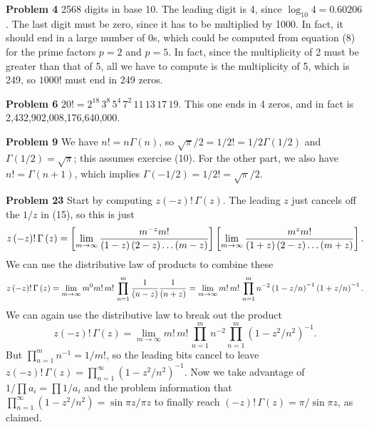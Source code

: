 \noindent
{\bf Problem 4} 2568 digits in base 10.  The leading digit is 4, since $\log_{10} 4 = 0.60206$.
 The last digit must be zero, since it has to be multiplied by 1000.  In fact,
 it should end in a large number of 0s, which could be computed from equation (8)
 for the prime factors $p=2$ and $p=5$.  In fact, since the multiplicity of 2 must be
 greater than that of 5, all we have to compute is the multiplicity of 5, which is 249,
 so $1000!$ must end in 249 zeros.

\vskip 0.1in
\noindent
{\bf Problem 6} $20! = 2^{18}\, 3^8\, 5^4\, 7^2\, 11\, 13\, 17\, 19$.  This one ends in
 4 zeros, and in fact is 2,432,902,008,176,640,000.

\vskip 0.1in
\noindent
{\bf Problem 9} We have $n! = n \Gamma\left(n\right)$, so $\sqrt{\pi}/2 = 1/2! = 1/2 \Gamma\left( 1/2 \right)$
 and $\Gamma\left(1/2\right) = \sqrt{\pi}$; this assumes exercise (10).  For the other part, we also have
 $n! = \Gamma\left(n+1\right)$, which implies $\Gamma\left(-1/2\right) = 1/2! = \sqrt{\pi}/2$.

\vskip 0.1in
\noindent
{\bf Problem 23} Start by computing $z \left(-z\right)! \, \Gamma \left( z \right)$.  The leading $z$ just cancels
 off the $1/z$ in (15), so this is just 
 $$
   z \left(-z\right)! \, \Gamma \left( z \right) =
      \left[ \lim_{m \to \infty} {m^{-z} m! \over \left(1-z\right)\left(2-z\right)
      \ldots\left(m-z\right)} \right] \left[ \lim_{m \to \infty} {m^{z} m! \over \left(1+z\right)\left(2-z\right)
      \ldots\left(m+z\right)} \right] .
 $$
 We can use the distributive law of products to combine these
 $$
    z \left(-z\right)! \, \Gamma \left( z \right) = \lim_{m \to \infty} m^0 m!\, m!\, \prod_{n=1}^{m}
       {1 \over \left( n-z \right)} {1 \over \left( n+z \right) } = \lim_{m \to \infty} m!\, m!\, \prod_{n=1}^{m}
        n^{-2} \left( 1 - z/n \right)^{-1} \left( 1 + z/n \right)^{-1}.
 $$
 We can again use the distributive law to break out the product 
 $$z \left(-z\right)! \, \Gamma \left( z \right)
  = \lim_{m \to \infty} m!\, m!\, \prod_{n=1}^{m} n^{-2} \prod_{n=1}^{m} \left(1 - z^2/n^2 \right)^{-1}.
 $$
 But $\prod_{n=1}^{m} n^{-1} = 1 / m!$, so the leading bits cancel to leave
 $z \left(-z\right)! \, \Gamma \left( z \right) = \prod_{n=1}^{\infty} \left(1 - z^2/n^2 \right)^{-1}$.
 Now we take advantage of $1 / \prod a_i = \prod 1 / a_i$ and the problem information that
  $\prod_{n=1}^{\infty} \left( 1 - z^2 / n^2 \right) = \sin \pi z / \pi z$ to finally reach
 $\left(-z\right)! \, \Gamma \left( z \right) = \pi / \sin \pi z$, as claimed.

